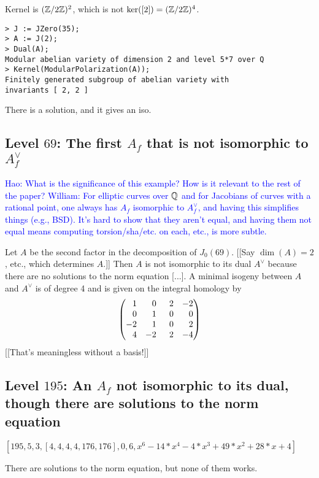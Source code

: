 \documentclass{article}
\newcommand{\Hao}[1]{\textcolor{blue}{\textsf{Hao: #1}}}
\newcommand{\wstein}[1]{\textcolor{blue}{\textsf{William: #1}}}
\begin{document}
Kernel is $(\mathbb{Z}/2\mathbb{Z})^2$, which is not $\ker([2])=(\mathbb{Z}/2\mathbb{Z})^4$.

\begin{verbatim}
> J := JZero(35);
> A := J(2);
> Dual(A);
Modular abelian variety of dimension 2 and level 5*7 over Q
> Kernel(ModularPolarization(A));
Finitely generated subgroup of abelian variety with
invariants [ 2, 2 ]
\end{verbatim}

There is a solution, and it gives an iso.

\subsection{Level $69$: The first $A_f$ that is not
isomorphic to $A_f^{\vee}$}

\Hao{What is the significance of this example? How is it relevant to the rest of the paper?}
\wstein{For elliptic curves over $\mathbb{Q}$ and for Jacobians of
curves with a rational point, one always has
$A_f$ isomorphic to $A_f^{\vee}$, and having this simplifies
things (e.g., BSD).  It's hard to show that they aren't equal,
and having them not equal means computing torsion/sha/etc. on each,
etc., is more subtle.}

Let $A$ be the second factor in the decomposition of $J_0(69)$.
[[Say $\dim(A) = 2$, etc., which determines $A$.]]
 Then $A$ is
not isomorphic to its dual $A^\vee$ because there are no solutions to the norm
equation [...].
A minimal isogeny between $A$ and $A^\vee$ is of degree 4 and is given on the integral
homology by
\[ \left( \begin{matrix}
\hfill 1 & \hfill 0 & \hfill 2 & -2 \\
\hfill 0 & \hfill 1 & \hfill 0 & \hfill 0 \\
-2 & \hfill 1 &\hfill  0 &\hfill  2 \\
\hfill 4 & -2 & \hspace{1.2ex} 2 & -4 \end{matrix} \right)\]
[[That's meaningless without a basis!]]


\subsection{Level $195$: An $A_f$ not isomorphic to
its dual, though there are solutions to the norm equation}

$[195, 5, 3, [ 4, 4, 4, 4, 176, 176 ], 0, 6, x^6 - 14*x^4 - 4*x^3 + 49*x^2 +
28*x + 4] $

There are solutions to the norm equation, but none of them works.


\end{document}
